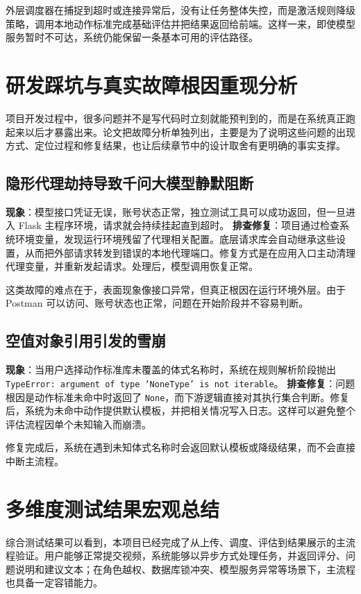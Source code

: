 \documentclass[UTF8,twoside]{ctexrep}
\makeatletter
\def@NAT@last@yr{\@citea}%
\def@NAT@last@yr{-\NAT@penalty}%
\makeatother
\begin{document}
外层调度器在捕捉到超时或连接异常后，没有让任务整体失控，而是激活规则降级策略，调用本地动作标准完成基础评估并把结果返回给前端。这样一来，即使模型服务暂时不可达，系统仍能保留一条基本可用的评估路径。

\section{研发踩坑与真实故障根因重现分析}

项目开发过程中，很多问题并不是写代码时立刻就能预判到的，而是在系统真正跑起来以后才暴露出来。论文把故障分析单独列出，主要是为了说明这些问题的出现方式、定位过程和修复结果，也让后续章节中的设计取舍有更明确的事实支撑。

\subsection{隐形代理劫持导致千问大模型静默阻断}
\textbf{现象}：模型接口凭证无误，账号状态正常，独立测试工具可以成功返回，但一旦进入 Flask 主程序环境，请求就会持续挂起直到超时。
\textbf{排查修复}：项目通过检查系统环境变量，发现运行环境残留了代理相关配置。底层请求库会自动继承这些设置，从而把外部请求转发到错误的本地代理端口。修复方式是在应用入口主动清理代理变量，并重新发起请求。处理后，模型调用恢复正常。

这类故障的难点在于，表面现象像接口异常，但真正根因在运行环境外层。由于 Postman 可以访问、账号状态也正常，问题在开始阶段并不容易判断。

\subsection{空值对象引用引发的雪崩}
\textbf{现象}：当用户选择动作标准库未覆盖的体式名称时，系统在规则解析阶段抛出 \texttt{TypeError: argument of type 'NoneType' is not iterable}。
\textbf{排查修复}：问题根因是动作标准未命中时返回了 \texttt{None}，而下游逻辑直接对其执行集合判断。修复后，系统为未命中动作提供默认模板，并把相关情况写入日志。这样可以避免整个评估流程因单个未知输入而崩溃。

修复完成后，系统在遇到未知体式名称时会返回默认模板或降级结果，而不会直接中断主流程。

\section{多维度测试结果宏观总结}
综合测试结果可以看到，本项目已经完成了从上传、调度、评估到结果展示的主流程验证。用户能够正常提交视频，系统能够以异步方式处理任务，并返回评分、问题说明和建议文本；在角色越权、数据库锁冲突、模型服务异常等场景下，主流程也具备一定容错能力。
\end{document}
